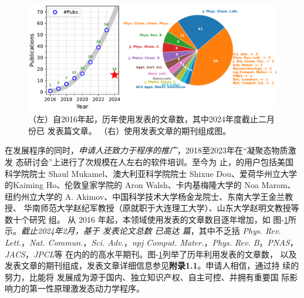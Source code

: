 \begin{figure}
  \centering
  \includegraphics[width=1.0\linewidth]{figs/hefei-namd_pub_v3.pdf}
  \caption{\label{fig:hnamd_pub_list}
    \kaishu{}\footnotesize
    （左）自2016年起，历年使用\hnamd{}发表的文章数，其中2024年度截止二月份已
    发表篇文章。
    （右）使用\hnamd{}发表文章的期刊组成图。
  }
\end{figure}


在发展程序的同时，\emph{申请人还致力于程序的推广}，2018至2023年在“凝聚态物质激发
态研讨会”上进行了次规模在人左右的软件培训。至今为
止，\hnamd{}的用户包括美国科学院院士 Shaul Mukamel、澳大利亚科学院院士 Shixue
Dou、爱荷华州立大学的Kaiming Ho、伦敦皇家学院的 Aron Walsh、卡内基梅隆大学的 Noa
Marom、纽约州立大学的 A. Akimov、中国科学技术大学杨金龙院士、东南大学王金兰教授、
华南师范大学赵纪军教授（原就职于大连理工大学）、山东大学赵明文教授等数十个研究
组。
从 {\large{}2016} 年起，本领域使用\hnamd{}发表的文章数目逐年增加，如
图-\ref{fig:hnamd_pub_list}所示。\emph{截止2024年2月，基于 \hnamd{} 发表论文总数
  已高达  篇}，其中不乏括 \textit{Phys. Rev.  Lett.}，\textit{Nat.
  Commun.}，\textit{Sci.  Adv.}，\textit{npj Comput.
  Mater.}，\textit{Phys. Rev.  B}，\textit{PNAS}，\textit{JACS}，\textit{JPCL}等
在内的的高水平期刊。图-\ref{fig:hnamd_pub_list}列举了历年利用\hnamd{}发表的文章数，
以及发表文章的期刊组成，发表文章详细信息参见\textbf{附录1.1}。申请人相信，通过持
续的努力，比能将 \hnamd{} 发展成为源于国内、独立知识产权、自主可控、并拥有重要国
际影响力的第一性原理激发态动力学程序。

